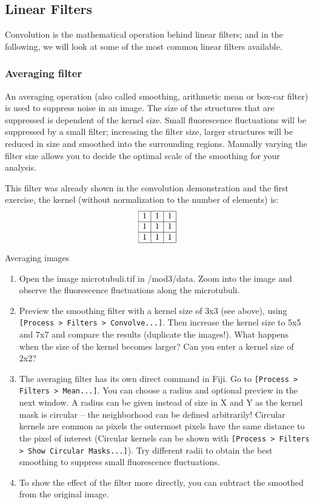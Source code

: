 \subsection{Linear Filters}
Convolution is the mathematical operation behind linear filters; and in the following, we will look at some of the most common linear filters available.

\subsubsection{Averaging filter}
An averaging operation (also called smoothing, arithmetic mean or box-car filter) is used to suppress noise in an image. The size of the structures that are suppressed is dependent of the kernel size. Small fluorescence fluctuations will be suppressed by a small filter; increasing the filter size, larger structures will be reduced in size and smoothed into the surrounding regions. Manually varying the filter size allows you to decide the optimal scale of the smoothing for your analysis.

This filter was already shown in the convolution demonstration and the first exercise, the kernel (without normalization to the number of elements) is:
	\[
		\begin{array}{|c|c|c|}
	\hline
	1&1&1\\
\hline
1&1&1\\
\hline
1&1&1\\
\hline
	\end{array}
\]

\begin{taskbox}{Averaging images}

\begin{enumerate}
	\item Open the image microtubuli.tif in /mod3/data. Zoom into the image and observe the fluorescence fluctuations along the microtubuli.
	\item Preview the smoothing filter with a kernel size of 3x3 (see above), using \texttt{[Process > Filters > Convolve...]}. Then increase the kernel size to 5x5 and 7x7 and compare the results (duplicate the images!). What happens when the size of the kernel becomes larger? Can you enter a kernel size of 2x2?
	\item The averaging filter has its own direct command in Fiji. Go to \texttt{[Process > Filters > Mean...]}. You can choose a radius and optional preview in the next window. A radius can be given instead of size in X and Y as the kernel mask is circular -- the neighborhood can be defined arbitrarily! Circular kernels are common as pixels the outermost pixels have the same distance to the pixel of interest (Circular kernels can be shown with \texttt{[Process > Filters > Show Circular Masks...]}). Try different radii to obtain the best smoothing to suppress small fluorescence fluctuations.
	\item To show the effect of the filter more directly, you can subtract the smoothed from the original image.
	\end{enumerate}
\end{taskbox}

